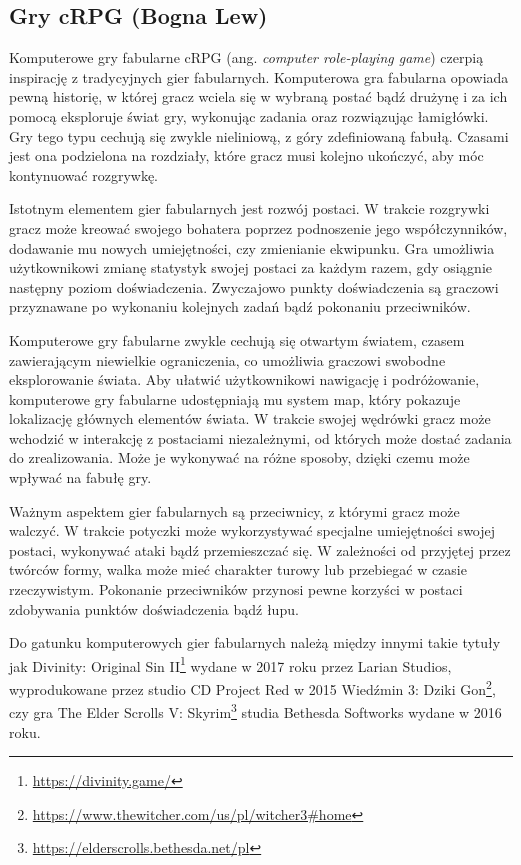 \subsection{Gry cRPG (Bogna Lew)}\label{ss:rpg}
Komputerowe gry fabularne cRPG (ang. \textit{computer role-playing game}) czerpią inspirację z tradycyjnych gier fabularnych. Komputerowa
gra fabularna opowiada pewną historię, w której gracz wciela się w wybraną postać bądź drużynę i
za ich pomocą eksploruje świat gry, wykonując zadania oraz rozwiązując łamigłówki. Gry tego typu cechują się zwykle
nieliniową, z góry zdefiniowaną fabułą. Czasami jest ona podzielona na rozdziały, które gracz musi kolejno ukończyć, aby
móc kontynuować rozgrywkę.

Istotnym elementem gier fabularnych jest rozwój postaci. W trakcie rozgrywki gracz może kreować swojego bohatera
poprzez podnoszenie jego współczynników, dodawanie mu nowych umiejętności, czy zmienianie ekwipunku. Gra umożliwia
użytkownikowi zmianę statystyk swojej postaci za każdym razem, gdy osiągnie następny poziom doświadczenia. Zwyczajowo
punkty doświadczenia są graczowi przyznawane po wykonaniu kolejnych zadań bądź pokonaniu przeciwników.

Komputerowe gry fabularne zwykle cechują się otwartym światem, czasem zawierającym niewielkie ograniczenia, co umożliwia
graczowi swobodne eksplorowanie świata. Aby ułatwić użytkownikowi nawigację i podróżowanie, komputerowe gry fabularne
udostępniają mu system map, który pokazuje lokalizację głównych elementów świata. W trakcie swojej wędrówki gracz może
wchodzić w interakcję z postaciami niezależnymi, od których może dostać zadania do zrealizowania. Może je wykonywać na
różne sposoby, dzięki czemu może wpływać na fabułę gry.

Ważnym aspektem gier fabularnych są przeciwnicy, z którymi gracz może walczyć. W trakcie potyczki może wykorzystywać
specjalne umiejętności swojej postaci, wykonywać ataki bądź przemieszczać się. W zależności od przyjętej przez twórców
formy, walka może mieć charakter turowy lub przebiegać w czasie rzeczywistym. Pokonanie przeciwników przynosi pewne
korzyści w postaci zdobywania punktów doświadczenia bądź łupu.

Do gatunku komputerowych gier fabularnych należą między innymi takie tytuły jak Divinity: Original Sin II\footnote{\url{https://divinity.game/}} wydane w 2017
roku przez Larian Studios, wyprodukowane przez studio CD Project Red w 2015 Wiedźmin 3: Dziki Gon\footnote{\url{https://www.thewitcher.com/us/pl/witcher3#home}}, czy gra The Elder
Scrolls V: Skyrim\footnote{\url{https://elderscrolls.bethesda.net/pl}} studia Bethesda Softworks wydane w 2016 roku.
